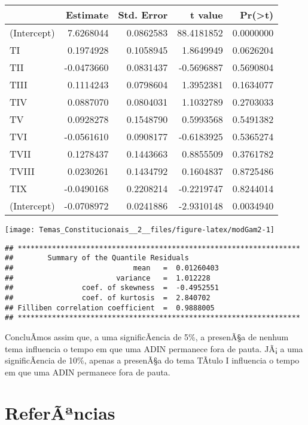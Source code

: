 \documentclass[]{article}
\begin{document}
\begin{longtable}[]{@{}lrrrr@{}}
\toprule
& Estimate & Std. Error & t value &
Pr(\textgreater{}\textbar{}t\textbar{})\tabularnewline
\midrule
\endhead
(Intercept) & 7.6268044 & 0.0862583 & 88.4181852 &
0.0000000\tabularnewline
TI & 0.1974928 & 0.1058945 & 1.8649949 & 0.0626204\tabularnewline
TII & -0.0473660 & 0.0831437 & -0.5696887 & 0.5690804\tabularnewline
TIII & 0.1114243 & 0.0798604 & 1.3952381 & 0.1634077\tabularnewline
TIV & 0.0887070 & 0.0804031 & 1.1032789 & 0.2703033\tabularnewline
TV & 0.0928278 & 0.1548790 & 0.5993568 & 0.5491382\tabularnewline
TVI & -0.0561610 & 0.0908177 & -0.6183925 & 0.5365274\tabularnewline
TVII & 0.1278437 & 0.1443663 & 0.8855509 & 0.3761782\tabularnewline
TVIII & 0.0230261 & 0.1434792 & 0.1604837 & 0.8725486\tabularnewline
TIX & -0.0490168 & 0.2208214 & -0.2219747 & 0.8244014\tabularnewline
(Intercept) & -0.0708972 & 0.0241886 & -2.9310148 &
0.0034940\tabularnewline
\bottomrule
\end{longtable}

\begin{center}\texttt{[image: Temas\_Constitucionais\_\_2\_\_files/figure-latex/modGam2-1]} \end{center}

\begin{verbatim}
## ******************************************************************
##        Summary of the Quantile Residuals
##                            mean   =  0.01260403 
##                        variance   =  1.012228 
##                coef. of skewness  =  -0.4952551 
##                coef. of kurtosis  =  2.840702 
## Filliben correlation coefficient  =  0.9888005 
## ******************************************************************
\end{verbatim}

ConcluÃ­mos assim que, a uma significÃ¢ncia de 5\%, a presenÃ§a de
nenhum tema influencia o tempo em que uma ADIN permanece fora de pauta.
JÃ¡ a uma significÃ¢ncia de 10\%, apenas a presenÃ§a do tema TÃ­tulo I
influencia o tempo em que uma ADIN permanece fora de pauta.

\section{ReferÃªncias}\label{referancias}
\end{document}
